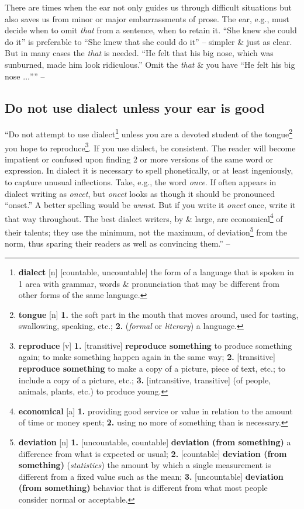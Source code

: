 \documentclass[oneside]{book}
\numberwithin{equation}{section}
\begin{document}
There are times when the ear not only guides us through difficult situations but also saves us from minor or major embarrassments of prose. The ear, e.g., must decide when to omit \textit{that} from a sentence, when to retain it. ``She knew she could do it'' is preferable to ``She knew that she could do it'' -- simpler \& just as clear. But in many cases the \textit{that} is needed. ``He felt that his big nose, which was sunburned, made him look ridiculous.'' Omit the \textit{that} \& you have ``He felt his big nose $\ldots$'''' -- \cite[Chap. 5, Sect. 14, pp. 92--93]{Strunk_White2019}

\subsection{Do not use dialect unless your ear is good}
``Do not attempt to use dialect\footnote{\textbf{dialect} [n] [countable, uncountable] the form of a language that is spoken in 1 area with grammar, words \& pronunciation that may be different from other forms of the same language.} unless you are a devoted student of the tongue\footnote{\textbf{tongue} [n] \textbf{1.} the soft part in the mouth that moves around, used for tasting, swallowing, speaking, etc.; \textbf{2.} (\textit{formal} or \textit{literary}) a language.} you hope to reproduce\footnote{\textbf{reproduce} [v] \textbf{1.} [transitive] \textbf{reproduce something} to produce something again; to make something happen again in the same way; \textbf{2.} [transitive] \textbf{reproduce something} to make a copy of a picture, piece of text, etc.; to include a copy of a picture, etc.; \textbf{3.} [intransitive, transitive] (of people, animals, plants, etc.) to produce young.}. If you use dialect, be consistent. The reader will become impatient or confused upon finding 2 or more versions of the same word or expression. In dialect it is necessary to spell phonetically, or at least ingeniously, to capture unusual inflections. Take, e.g., the word \textit{once}. If often appears in dialect writing as \textit{oncet}, but \textit{oncet} looks as though it should be pronounced ``onset.'' A better spelling would be \textit{wunst}. But if you write it \textit{oncet} once, write it that way throughout. The best dialect writers, by \& large, are economical\footnote{\textbf{economical} [a] \textbf{1.} providing good service or value in relation to the amount of time or money spent; \textbf{2.} using no more of something than is necessary.} of their talents; they use the minimum, not the maximum, of deviation\footnote{\textbf{deviation} [n] \textbf{1.} [uncountable, countable] \textbf{deviation (from something)} a difference from what is expected or usual; \textbf{2.} [countable] \textbf{deviation (from something)} (\textit{statistics}) the amount by which a single measurement is different from a fixed value such as the mean; \textbf{3.} [uncountable] \textbf{deviation (from something)} behavior that is different from what most people consider normal or acceptable.} from the norm, thus sparing their readers as well as convincing them.'' -- \cite[Chap. 5, Sect. 15, p. 94]{Strunk_White2019}
\end{document}
